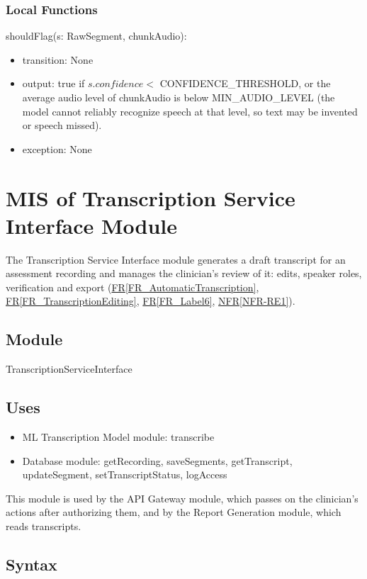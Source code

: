 \documentclass[12pt, titlepage]{article}
\newcommand{\srsref}[2]{\href{https://github.com/Nour-Fawaz/MacaBoca/blob/main/pdfs/SRS/SRS.pdf}{#1\ref*{#2}}}
\begin{document}
\subsubsection{Local Functions}

\noindent shouldFlag(s: RawSegment, chunkAudio):
\begin{itemize}
\item transition: None
\item output: true if $s.confidence <$ CONFIDENCE\_THRESHOLD, or the average audio level of chunkAudio is below MIN\_AUDIO\_LEVEL (the model cannot reliably recognize speech at that level, so text may be invented or speech missed).
\item exception: None
\end{itemize}


\newpage
\section{MIS of Transcription Service Interface Module} \label{TranscriptionServiceInterface}
The Transcription Service Interface module generates a draft transcript for an assessment recording and manages the clinician's review of it: edits, speaker roles, verification and export (\srsref{FR}{FR_AutomaticTranscription}, \srsref{FR}{FR_TranscriptionEditing}, \srsref{FR}{FR_Label6}, \srsref{NFR}{NFR-RE1}).

\subsection{Module}
TranscriptionServiceInterface

\subsection{Uses}
\begin{itemize}
\item ML Transcription Model module: transcribe
\item Database module: getRecording, saveSegments, getTranscript, updateSegment, setTranscriptStatus, logAccess
\end{itemize}
This module is used by the API Gateway module, which passes on the clinician's actions after authorizing them, and by the Report Generation module, which reads transcripts.

\subsection{Syntax}
\end{document}
